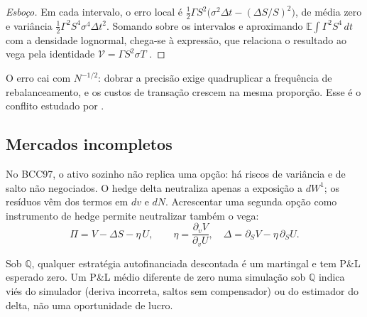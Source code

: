 \begin{proof}[Esboço]
Em cada intervalo, o erro local é $\tfrac12\Gamma S^2\big(\sigma^2\Delta t-(\Delta S/S)^2\big)$, de média zero e variância $\tfrac12\Gamma^2S^4\sigma^4\Delta t^2$. Somando sobre os intervalos e aproximando $\mathbb E\int\Gamma^2S^4\,dt$ com a densidade lognormal, chega-se à expressão, que relaciona o resultado ao vega pela identidade $\mathcal V=\Gamma S^2\sigma T$ \citep{wilmott2006}.
\end{proof}

O erro cai com $N^{-1/2}$: dobrar a precisão exige quadruplicar a frequência de rebalanceamento, e os custos de transação crescem na mesma proporção. Esse é o conflito estudado por \citet{leland1985}.

\subsection{Mercados incompletos}

\begin{observacao}
No BCC97, o ativo sozinho não replica uma opção: há riscos de variância e de salto não negociados. O hedge delta neutraliza apenas a exposição a $dW^1$; os resíduos vêm dos termos em $dv$ e $dN$. Acrescentar uma segunda opção como instrumento de hedge permite neutralizar também o vega:
\begin{equation}
\Pi=V-\Delta S-\eta\,U,\qquad \eta=\frac{\partial_vV}{\partial_vU},\quad \Delta=\partial_SV-\eta\,\partial_SU.
\end{equation}
\end{observacao}

\begin{observacao}[Média do P\&L]
Sob $\mathbb Q$, qualquer estratégia autofinanciada descontada é um martingal e tem P\&L esperado zero. Um P\&L médio diferente de zero numa simulação sob $\mathbb Q$ indica viés do simulador (deriva incorreta, saltos sem compensador) ou do estimador do delta, não uma oportunidade de lucro.
\end{observacao}
